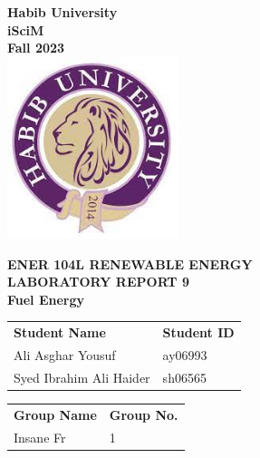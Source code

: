 \documentclass[a4paper, 12pt, english]{article}
\begin{document}
\begin{titlepage}
	\begin{center}
		\textbf{\LARGE Habib University}\\[0.5cm]
		\textbf{\large iSciM}\\[0.2cm]
		\textbf {\large Fall 2023}\\[0.2cm]
		\vspace{20pt}
		\includegraphics[width=5cm]{../habiblogo.jpg}\\[1cm]
		\par
		\vspace{20pt}
		\textbf{\Large ENER 104L RENEWABLE ENERGY}\\
		\vspace{15pt}
		\myrule[1pt][7pt]
		\textbf{\LARGE  LABORATORY REPORT 9}\\
		\vspace{15pt}
		\textbf{\large Fuel Energy}\\
		\myrule[1pt][7pt]
		\vspace{25pt}
		\begin{tabular}{@{}p{5cm}p{3cm}@{}}
			\textbf{\large Student Name} & \textbf{\large Student ID} \\
			Ali Asghar Yousuf            & ay06993                    \\ %
			Syed Ibrahim Ali Haider      & sh06565                    \\ %
		\end{tabular}

		\vspace{10pt}
		\begin{tabular}{@{}p{5cm}p{3cm}@{}}
			\textbf{\large Group Name} & \textbf{\large Group No.} \\
			Insane Fr                  & 1                         \\
		\end{tabular}


\end{center}
\end{titlepage}
\end{document}
